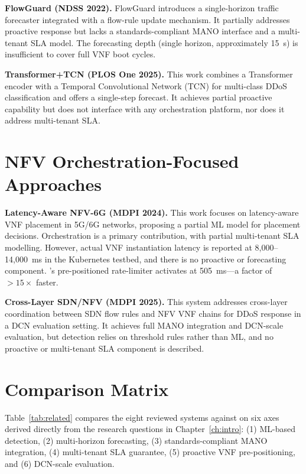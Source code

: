 \textbf{FlowGuard (NDSS 2022).}
FlowGuard introduces a single-horizon traffic forecaster integrated
with a flow-rule update mechanism. It partially addresses proactive
response but lacks a standards-compliant MANO interface and a multi-tenant
SLA model. The forecasting depth (single horizon, approximately 15~s)
is insufficient to cover full VNF boot cycles.

\textbf{Transformer+TCN (PLOS One 2025).}
This work combines a Transformer encoder with a Temporal Convolutional
Network (TCN) for multi-class DDoS classification and offers a
single-step forecast. It achieves partial proactive capability but
does not interface with any orchestration platform, nor does it address
multi-tenant SLA.

\section{NFV Orchestration-Focused Approaches}
\label{sec:related-nfv}

\textbf{Latency-Aware NFV-6G (MDPI 2024).}
This work focuses on latency-aware VNF placement in 5G/6G networks,
proposing a partial ML model for placement decisions. Orchestration is
a primary contribution, with partial multi-tenant SLA modelling. However,
actual VNF instantiation latency is reported at 8{,}000--14{,}000~ms in
the Kubernetes testbed, and there is no proactive or forecasting component.
\padonap{}'s pre-positioned rate-limiter activates at 505~ms---a factor
of $>15\times$ faster.

\textbf{Cross-Layer SDN/NFV (MDPI 2025).}
This system addresses cross-layer coordination between SDN flow rules
and NFV VNF chains for DDoS response in a DCN evaluation setting.
It achieves full MANO integration and DCN-scale evaluation, but
detection relies on threshold rules rather than ML, and no proactive
or multi-tenant SLA component is described.

\section{Comparison Matrix}
\label{sec:related-matrix}

Table~\ref{tab:related} compares the eight reviewed systems against
\padonap{} on six axes derived directly from the research questions in
Chapter~\ref{ch:intro}: (1) ML-based detection, (2) multi-horizon
forecasting, (3) standards-compliant MANO integration, (4) multi-tenant
SLA guarantee, (5) proactive VNF pre-positioning, and (6) DCN-scale
evaluation.

